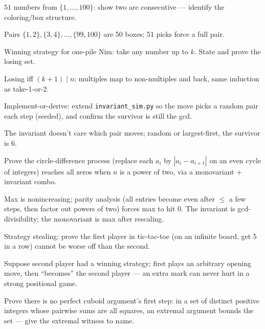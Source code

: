 \begin{exercise}[medium]\label{exr:ia7}
$51$ numbers from $\{1,\dots,100\}$: show two are consecutive ---
identify the coloring/box structure.
\end{exercise}
\begin{solution}
Pairs $\{1,2\},\{3,4\},\dots,\{99,100\}$ are 50 boxes; 51 picks force a
full pair.
\end{solution}
\begin{exercise}[medium]\label{exr:ia8}
Winning strategy for one-pile Nim: take any number up to $k$. State and
prove the losing set.
\end{exercise}
\begin{solution}
Losing iff $(k+1)\mid n$: multiples map to non-multiples and back,
same induction as take-1-or-2.
\end{solution}
\begin{exercise}[medium]\label{exr:ia9}
Implement-or-derive: extend \texttt{invariant\_sim.py} so the move
picks a random pair each step (seeded), and confirm the survivor is
still the gcd.
\end{exercise}
\begin{solution}
The invariant doesn't care which pair moves; random or largest-first,
the survivor is $6$.
\end{solution}
\begin{exercise}[hard]\label{exr:ia10}
Prove the circle-difference process (replace each $a_i$ by
$|a_i - a_{i+1}|$ on an even cycle of integers) reaches all zeros
when $n$ is a power of two, via a monovariant + invariant combo.
\end{exercise}
\begin{solution}
Max is nonincreasing; parity analysis (all entries become even after
$\le$ a few steps, then factor out powers of two) forces max to hit 0.
The invariant is gcd-divisibility; the monovariant is max after
rescaling.
\end{solution}
\begin{exercise}[hard]\label{exr:ia11}
Strategy stealing: prove the first player in tic-tac-toe (on an
infinite board, get 5 in a row) cannot be worse off than the second.
\end{exercise}
\begin{solution}
Suppose second player had a winning strategy; first plays an arbitrary
opening move, then ``becomes'' the second player --- an extra mark can
never hurt in a strong positional game.
\end{solution}
\begin{exercise}[hard]\label{exr:ia12}
Prove there is no perfect cuboid argument's first step: in a set of
distinct positive integers whose pairwise sums are all squares, an
extremal argument bounds the set --- give the extremal witness to name.
\end{exercise}
